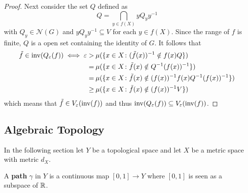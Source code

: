 \begin{proof}
  Next consider the set $Q$ defined as \[ Q = \bigcap\limits_{y \in f(X)}yQ_yy^{-1}\] with $Q_y \in \mathcal{N}(G)$ and $yQ_yy^{-1} \subseteq V$ for each $y \in f(X)$. Since the range of $f$ is finite, $Q$ is a open set containing the identity of $G$.
  It follows that
  \begin{align*}
    \tilde{f} \in {\rm inv}(Q_\varepsilon(f)) \iff \varepsilon > \: &\mu(\{x \in X\colon (\tilde{f}(x))^{-1} \notin f(x)Q\}) \\
    = \: &\mu(\{x \in X\colon \tilde{f}(x) \notin Q^{-1}(f(x))^{-1}\})\\
    = \: &\mu(\{x \in X\colon \tilde{f}(x) \notin (f(x))^{-1}f(x)Q^{-1}(f(x))^{-1}\})\\
    \geq \: &\mu(\{x \in X\colon \tilde{f}(x) \notin (f(x))^{-1}V\})             
  \end{align*}
  which means that $\tilde{f} \in V_{\varepsilon}({\rm inv}(f))$ and thus ${\rm inv}(Q_\varepsilon(f)) \subseteq V_{\varepsilon}({\rm inv}(f))$.
\end{proof}

\subsection{Algebraic Topology}
In the following section let $Y$ be a topological space and let $X$ be a metric space with metric $d_X$.

\begin{defin}
  A \textbf{path} $\gamma$ in $Y$ is a continuous map $[0,1] \to Y$ where $[0,1]$ is seen as a subspace of $\mathbb{R}$.
\end{defin}

